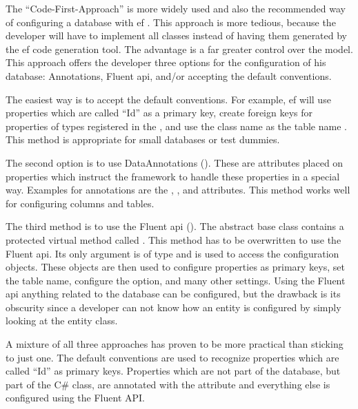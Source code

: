 The \enquote{Code-First-Approach} is more widely used and also the recommended way of configuring a database with \gls{ef} \cite{efCreateModel}. This approach is more tedious, because the developer will have to implement all classes instead of having them generated by the \gls{ef} code generation tool. The advantage is a far greater control over the model. This approach offers the developer three options for the configuration of his database: Annotations, Fluent \gls{api}, and/or accepting the default conventions.

The easiest way is to accept the default conventions. For example, \gls{ef} will use properties which are called \enquote{Id} as a primary key, create foreign keys for properties of types registered in the , and use the class name as the table name \cite{efConventions}. This method is appropriate for small databases or test dummies.

The second option is to use DataAnnotations (). These are attributes placed on properties which instruct the framework to handle these properties in a special way. Examples for annotations are the \lstcode{[Key]}, \lstcode{[ForeignKey]}, and \lstcode{[NotMapped]} attributes. This method works well for configuring columns and tables.


The third method is to use the Fluent \gls{api} (). The  abstract base class contains a protected virtual method called . This method has to be overwritten to use the Fluent \gls{api}. Its only argument is of type  and is used to access the  configuration objects. These  objects are then used to configure properties as primary keys, set the table name, configure the  option, and many other settings. Using the Fluent \gls{api} anything related to the database can be configured, but the drawback is its obscurity since a developer can not know how an entity is configured by simply looking at the entity class.


A mixture of all three approaches has proven to be more practical than sticking to just one. The default conventions are used to recognize properties which are called \enquote{Id} as primary keys. Properties which are not part of the database, but part of the C\# class, are annotated with the \lstcode{[NotMapped]} attribute and everything else is configured using the Fluent API.

